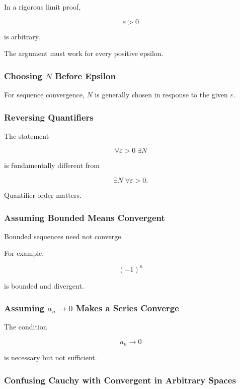In a rigorous limit proof,

\[
\varepsilon>0
\]

is arbitrary.

The argument must work for every positive epsilon.

\subsubsection{Choosing \(N\) Before Epsilon}

For sequence convergence, \(N\) is generally chosen in response to the
given \(\varepsilon\).

\subsubsection{Reversing Quantifiers}

The statement

\[
\forall\varepsilon>0\;\exists N
\]

is fundamentally different from

\[
\exists N\;\forall\varepsilon>0.
\]

Quantifier order matters.

\subsubsection{Assuming Bounded Means Convergent}

Bounded sequences need not converge.

For example,

\[
(-1)^n
\]

is bounded and divergent.

\subsubsection{Assuming \(a_n\to0\) Makes a Series Converge}

The condition

\[
a_n\to0
\]

is necessary but not sufficient.

\subsubsection{Confusing Cauchy with Convergent in Arbitrary Spaces}

